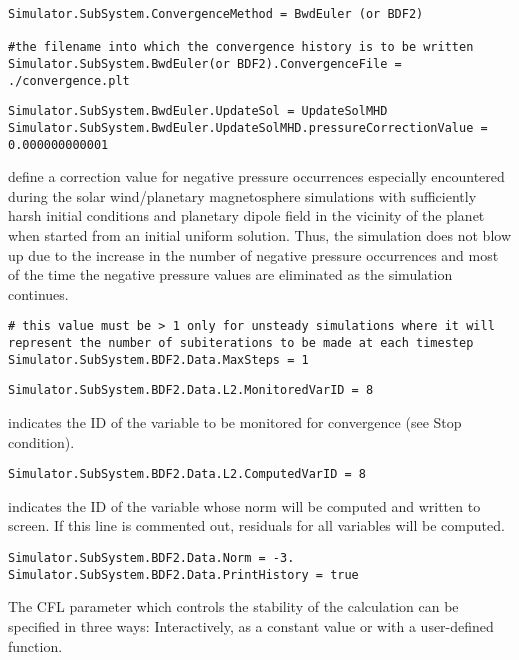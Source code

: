 \documentclass[11pt]{article}
\begin{document}
\begin{lstlisting}[breaklines]
Simulator.SubSystem.ConvergenceMethod = BwdEuler (or BDF2)

#the filename into which the convergence history is to be written
Simulator.SubSystem.BwdEuler(or BDF2).ConvergenceFile = ./convergence.plt
\end{lstlisting}

\begin{lstlisting}[breaklines]
Simulator.SubSystem.BwdEuler.UpdateSol = UpdateSolMHD
Simulator.SubSystem.BwdEuler.UpdateSolMHD.pressureCorrectionValue = 0.000000000001
\end{lstlisting}
define a correction value for negative pressure occurrences especially encountered during the solar wind/planetary magnetosphere simulations with sufficiently harsh initial conditions and planetary dipole field in the vicinity of the planet when started from an initial uniform solution. Thus, the simulation does not blow up due to the increase in the number of negative pressure occurrences and most of the time the negative pressure values are eliminated as the simulation continues.

\begin{lstlisting}[breaklines]
# this value must be > 1 only for unsteady simulations where it will represent the number of subiterations to be made at each timestep
Simulator.SubSystem.BDF2.Data.MaxSteps = 1
\end{lstlisting}

\begin{lstlisting}[breaklines]
Simulator.SubSystem.BDF2.Data.L2.MonitoredVarID = 8
\end{lstlisting}
indicates the ID of the variable to be monitored for convergence (see Stop condition). 
\begin{lstlisting}[breaklines]
Simulator.SubSystem.BDF2.Data.L2.ComputedVarID = 8 
\end{lstlisting}
indicates the ID of the variable whose norm will be computed and written to screen. If this line is commented out, residuals 
for all variables will be computed.

\begin{lstlisting}[breaklines]
Simulator.SubSystem.BDF2.Data.Norm = -3.
Simulator.SubSystem.BDF2.Data.PrintHistory = true
\end{lstlisting}

The CFL parameter which controls the stability of the calculation can be specified in three ways:
Interactively, as a constant value or with a user-defined function.
\end{document}
